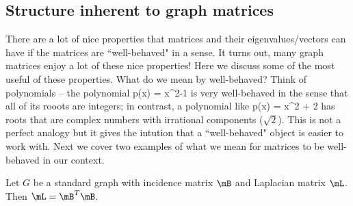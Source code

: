 \subsection{Structure inherent to graph matrices}\label{sec:fundamentals:graphstructure}

There are a lot of nice properties that matrices and their eigenvalues/vectors can have if the matrices are ``well-behaved" in a sense. It turns out, many graph matrices enjoy a lot of these nice properties! Here we discuss some of the most useful of these properties. What do we mean by well-behaved? Think of polynomials -- the polynomial p(x) = x^2-1 is very well-behaved in the sense that all of its rooots are integers; in contrast, a polynomial like p(x) = x^2 + 2 has roots that are complex numbers with irrational components ($\sqrt{2}$). This is not a perfect analogy but it gives the intution that a ``well-behaved" object is easier to work with. Next we cover two examples of what we mean for matrices to be well-behaved in our context.

\begin{proposition}
  Let $G$ be a standard graph with incidence matrix $\mB$ and Laplacian matrix $\mL$. Then $\mL = \mB^T\mB$.
\end{proposition}
